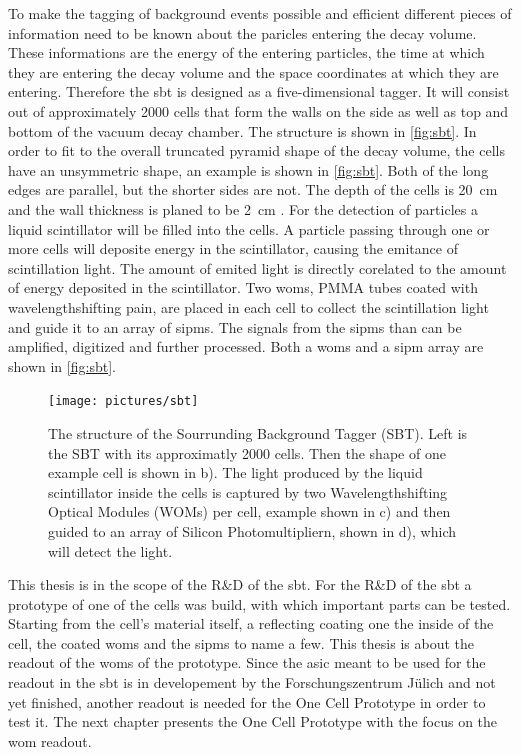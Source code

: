 To make the tagging of background events possible and efficient different pieces of information need to be known about the paricles entering the decay volume.
These informations are the energy of the entering particles, the time at which they are entering the decay volume and the space coordinates at which they are entering.
Therefore the \ac{sbt} is designed as a five-dimensional tagger.
It will consist out of approximately 2000 cells that form the walls on the side as well as top and bottom of the vacuum decay chamber.
The structure is shown in \autoref{fig:sbt}.
In order to fit to the overall truncated pyramid shape of the decay volume, the cells have an unsymmetric shape, an example is shown in \autoref{fig:sbt}.
Both of the long edges are parallel, but the shorter sides are not.
The depth of the cells is \SI{20}{\centi\meter} and the wall thickness is planed to be \SI{2}{\centi\meter} \cite{}.
For the detection of particles a liquid scintillator will be filled into the cells.
A particle passing through one or more cells will deposite energy in the scintillator, causing the emitance of scintillation light.
The amount of emited light is directly corelated to the amount of energy deposited in the scintillator.
Two \acp{wom}, PMMA tubes coated with wavelengthshifting pain, are placed in each cell to collect the scintillation light and guide it to an array of \acp{sipm}.
The signals from the \acp{sipm} than can be amplified, digitized and further processed.
Both a \acp{wom} and a \ac{sipm} array are shown in \autoref{fig:sbt}.

\begin{figure}
	\centering
	\texttt{[image: pictures/sbt]}
	\caption[Overview of the Sourrunding Background Tagger]{The structure of the Sourrunding Background Tagger (SBT). Left is the SBT with its approximatly 2000 cells. Then the shape of one example cell is shown in b). The light produced by the liquid scintillator inside the cells is captured by two Wavelengthshifting Optical Modules (WOMs) per cell, example shown in c) and then guided to an array of Silicon Photomultipliern, shown in d), which will detect the light.}
\end{figure}

This thesis is in the scope of the R\&D of the \ac{sbt}.
For the R\&D of the \ac{sbt} a prototype of one of the cells was build, with which important parts can be tested.
Starting from the cell's material itself, a reflecting coating one the inside of the cell, the coated \acp{wom} and the \acp{sipm} to name a few.
This thesis is about the readout of the \acp{wom} of the prototype.
Since the \ac{asic} meant to be used for the readout in the \ac{sbt} is in developement by the Forschungszentrum Jülich and not yet finished, another readout is needed for the One Cell Prototype in order to test it.
The next chapter presents the One Cell Prototype with the focus on the \ac{wom} readout.
